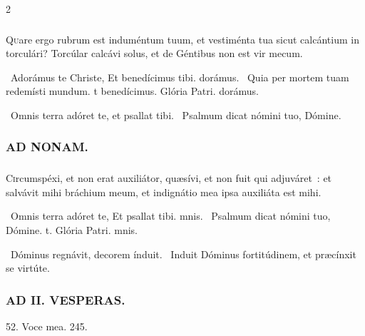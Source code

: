 \documentclass[9pt,twoside]{extarticle}
\begin{document}
\begin{multicols}{2}
\subsubsection*{}
\lettrine{Q}uare ergo rubrum est induméntum tuum, et vestiménta tua sicut calcántium in torculári? Torcúlar calcávi solus, et de Géntibus non est vir mecum.

\begin{tightlist}{}
\item {}~Adorámus te Christe, \textred{*} Et benedícimus tibi. dorámus. ~Quia per mortem tuam redemísti mundum. t benedícimus. Glória Patri. dorámus.
\item {}~Omnis terra adóret te, et psallat tibi. ~Psalmum dicat nómini tuo, Dómine.
\end{tightlist}

\subsubsection*{\center \textsc{AD NONAM.}}
\subsubsection*{}
\lettrine{C}ircumspéxi, et non erat auxiliátor, quæsívi, et non fuit qui adjuváret~: et salvávit mihi bráchium meum, et indignátio mea ipsa auxiliáta est mihi.

\begin{tightlist}{}
\item {}~Omnis terra adóret te, \textred{*} Et psallat tibi. mnis. ~Psalmum dicat nómini tuo, Dómine. t. Glória Patri. mnis.
\item {}~Dóminus regnávit, decorem índuit. ~Induit Dóminus fortitúdinem, et præcínxit se virtúte.
\end{tightlist}

\subsubsection*{\center \textsc{AD II. VESPERAS.}}
\begin{tightlist}{}
\item {} 52.  Voce mea. 245.
\end{tightlist}


\end{multicols}
\end{document}
